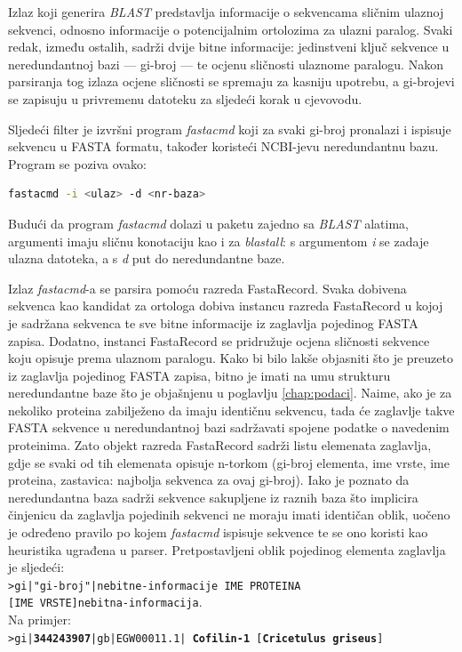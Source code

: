 Izlaz koji generira \emph{BLAST} predstavlja informacije o sekvencama sličnim
ulaznoj sekvenci, odnosno informacije o potencijalnim ortolozima za ulazni
paralog. Svaki redak, između ostalih, sadrži dvije bitne informacije:
jedinstveni ključ sekvence u neredundantnoj bazi --- gi-broj --- te ocjenu
sličnosti ulaznome paralogu. Nakon parsiranja tog izlaza ocjene sličnosti se
spremaju za kasniju upotrebu, a gi-brojevi se zapisuju u privremenu datoteku za
sljedeći korak u cjevovodu.

Sljedeći filter je izvršni program \emph{fastacmd} koji za svaki gi-broj pronalazi
i ispisuje sekvencu u FASTA formatu, također koristeći NCBI-jevu neredundantnu
bazu. Program se poziva ovako:
\begin{lstlisting}[language=bash]
fastacmd -i <ulaz> -d <nr-baza>
\end{lstlisting}
Budući da program \emph{fastacmd} dolazi u paketu zajedno sa \emph{BLAST}
alatima, argumenti imaju sličnu konotaciju kao i za \emph{blastall}: s
argumentom \emph{i} se zadaje ulazna datoteka, a s \emph{d} put do neredundantne
baze.

Izlaz \emph{fastacmd}-a se parsira pomoću razreda FastaRecord. Svaka dobivena
sekvenca kao kandidat za ortologa dobiva instancu razreda FastaRecord u kojoj je
sadržana sekvenca te sve bitne informacije iz zaglavlja pojedinog FASTA zapisa.
Dodatno, instanci FastaRecord se pridružuje ocjena sličnosti sekvence koju
opisuje prema ulaznom paralogu. Kako bi bilo lakše objasniti što je preuzeto iz
zaglavlja pojedinog FASTA zapisa, bitno je imati na umu strukturu neredundantne
baze što je objašnjenu u poglavlju \ref{chap:podaci}. Naime, ako je za nekoliko
proteina zabilježeno da imaju identičnu sekvencu, tada će zaglavlje takve FASTA
sekvence u neredundantnoj bazi sadržavati spojene podatke o navedenim
proteinima. 
Zato objekt razreda FastaRecord sadrži listu elemenata zaglavlja,
gdje se svaki od tih elemenata opisuje n-torkom (gi-broj elementa, ime vrste, ime
proteina, zastavica: najbolja sekvenca za ovaj gi-broj). Iako je poznato
da neredundantna baza sadrži sekvence sakupljene iz raznih baza što implicira
činjenicu da zaglavlja pojedinih sekvenci ne moraju imati identičan oblik,
uočeno je određeno pravilo po kojem \emph{fastacmd} ispisuje sekvence te se ono
koristi kao heuristika ugrađena u parser. Pretpostavljeni oblik pojedinog
elementa zaglavlja je sljedeći:\\
\texttt{>gi|"gi-broj"|nebitne-informacije IME PROTEINA}\\
\texttt{[IME VRSTE]nebitna-informacija}.\\
Na primjer:\\
\texttt{>gi|\textbf{344243907}|gb|EGW00011.1| \textbf{Cofilin-1}
[\textbf{Cricetulus griseus}]}\\

